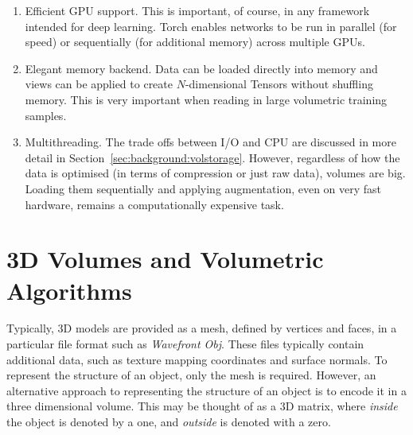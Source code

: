 \begin{enumerate}
\item Efficient GPU support. This is important, of course, in any
  framework intended for deep learning. Torch enables networks to be
  run in parallel (for speed) or sequentially (for additional memory)
  across multiple GPUs.
\item Elegant memory backend. Data can be loaded directly into memory
  and views can be applied to create $N$-dimensional Tensors without
  shuffling memory. This is very important when reading in large
  volumetric training samples.
\item Multithreading. The trade offs between I/O and CPU are discussed
  in more detail in Section~\ref{sec:background:volstorage}. However,
  regardless of how the data is optimised (in terms of compression or
  just raw data), volumes are big. Loading them sequentially and
  applying augmentation, even on very fast hardware, remains a
  computationally expensive task.
\end{enumerate}


\section{3D Volumes and Volumetric Algorithms}
\label{sec:background:volumes}

Typically, 3D models are provided as a mesh, defined by vertices and
faces, in a particular file format such as \textit{Wavefront
  Obj}. These files typically contain additional data, such as texture
mapping coordinates and surface normals. To represent the structure of
an object, only the mesh is required. However, an alternative approach
to representing the structure of an object is to encode it in a three
dimensional volume. This may be thought of as a 3D matrix, where
\textit{inside} the object is denoted by a one, and \textit{outside}
is denoted with a zero.

